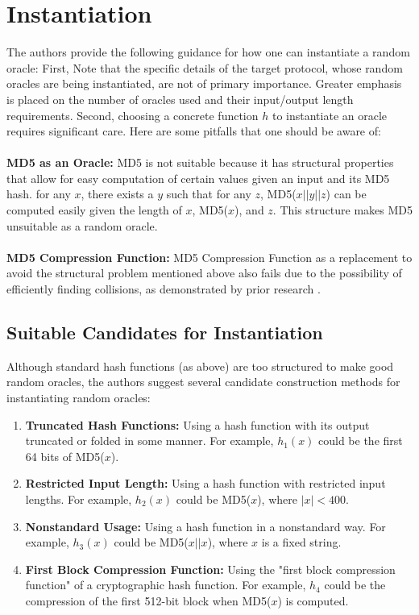 \documentclass{article}
\begin{document}

\section{Instantiation}
The authors provide the following guidance for how one can instantiate a random oracle:
First, Note that the specific details of the target protocol, whose random oracles are being instantiated, are not of primary importance. Greater emphasis is placed on the number of oracles used and their input/output length requirements. Second, choosing a concrete function $h$ to instantiate an oracle requires significant care. Here are some pitfalls that one should be aware of:
\\\\
\textbf{MD5 as an Oracle:} MD5 is not suitable because it has structural properties \cite{10.1145/141809.141812} that allow for easy computation of certain values given an input and its MD5 hash. for any $x$, there exists a $y$ such that for any $z$, MD5($x || y || z$) can be computed easily given the length of $x$, MD5($x$), and $z$. This structure makes MD5 unsuitable as a random oracle.
\\\\
\textbf{MD5 Compression Function:} MD5 Compression Function as a replacement to avoid the structural problem mentioned above also fails due to the possibility of efficiently finding collisions, as demonstrated by prior research \cite{den1993collisions}.

\subsection{Suitable Candidates for Instantiation}
Although standard hash functions (as above) are too structured to make good random oracles, the authors suggest several candidate construction methods for instantiating random oracles:
\begin{enumerate}
    \item \textbf{Truncated Hash Functions:} Using a hash function with its output truncated or folded in some manner. For example, $h_1(x)$ could be the first 64 bits of MD5($x$).
    \item \textbf{Restricted Input Length:} Using a hash function with restricted input lengths. For example, $h_2(x)$ could be MD5($x$), where $|x| < 400$.
    \item \textbf{Nonstandard Usage:} Using a hash function in a nonstandard way. For example, $h_3(x)$ could be MD5($x || x$), where $x$ is a fixed string.
    \item \textbf{First Block Compression Function:}  Using the "first block compression function" of a cryptographic hash function. For example, $h_4$ could be the compression of the first 512-bit block when MD5($x$) is computed.
\end{enumerate}
\end{document}
